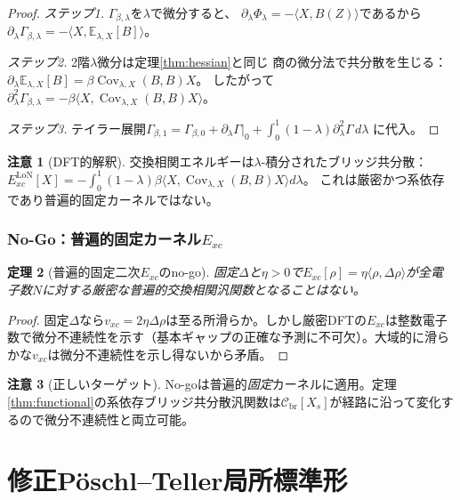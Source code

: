 \documentclass[12pt]{article}
\theoremstyle{plain}
\newtheorem{theorem}{定理}[section]
\theoremstyle{definition}
\newtheorem{remark}[theorem]{注意}
\numberwithin{equation}{section}
\newcommand{\br}{\mathrm{br}}
\newcommand{\LoN}{\mathrm{LoN}}
\DeclareMathOperator{\Cov}{Cov}
\begin{document}
\begin{proof}
\emph{ステップ1.}
$\Gamma_{\beta,\lambda}$を$\lambda$で微分すると、
$\partial_\lambda\Phi_\lambda = -\langle X,B(Z)\rangle$であるから
$\partial_\lambda\Gamma_{\beta,\lambda}
= -\langle X,\mathbb{E}_{\lambda,X}[B]\rangle$。

\emph{ステップ2.}
2階$\lambda$微分は定理\ref{thm:hessian}と同じ
商の微分法で共分散を生じる：
$\partial_\lambda\mathbb{E}_{\lambda,X}[B]
= \beta\Cov_{\lambda,X}(B,B)X$。
したがって
$\partial_\lambda^2\Gamma_{\beta,\lambda}
= -\beta\langle X,\Cov_{\lambda,X}(B,B)X\rangle$。

\emph{ステップ3.}
テイラー展開$\Gamma_{\beta,1}
= \Gamma_{\beta,0}+\partial_\lambda\Gamma|_0
+ \int_0^1(1-\lambda)\partial_\lambda^2\Gamma\,d\lambda$
に代入。
\end{proof}

\begin{remark}[DFT的解釈]
交換相関エネルギーは$\lambda$-積分されたブリッジ共分散：
$E_{xc}^{\LoN}[X] = -\int_0^1(1-\lambda)\beta
\langle X,\Cov_{\lambda,X}(B,B)X\rangle d\lambda$。
これは厳密かつ系依存であり普遍的固定カーネルではない。
\end{remark}


\section{No-Go：普遍的固定カーネル$E_{xc}$}\label{sec:nogo_Exc}

\begin{theorem}[普遍的固定二次$E_{xc}$のno-go]\label{thm:nogo_Exc}
固定$\Delta$と$\eta>0$で$E_{xc}[\rho]=\eta\langle\rho,\Delta\rho\rangle$が全電子数$N$に対する厳密な普遍的交換相関汎関数となることはない。
\end{theorem}

\begin{proof}
固定$\Delta$なら$v_{xc}=2\eta\Delta\rho$は至る所滑らか。しかし厳密DFTの$E_{xc}$は整数電子数で微分不連続性を示す（基本ギャップの正確な予測に不可欠）。大域的に滑らかな$v_{xc}$は微分不連続性を示し得ないから矛盾。
\end{proof}

\begin{remark}[正しいターゲット]
No-goは普遍的\emph{固定}カーネルに適用。定理\ref{thm:functional}の系依存ブリッジ共分散汎関数は$\mathcal{C}_{\br}[X_s]$が経路に沿って変化するので微分不連続性と両立可能。
\end{remark}


\part{修正P\"oschl--Teller局所標準形}
\end{document}
